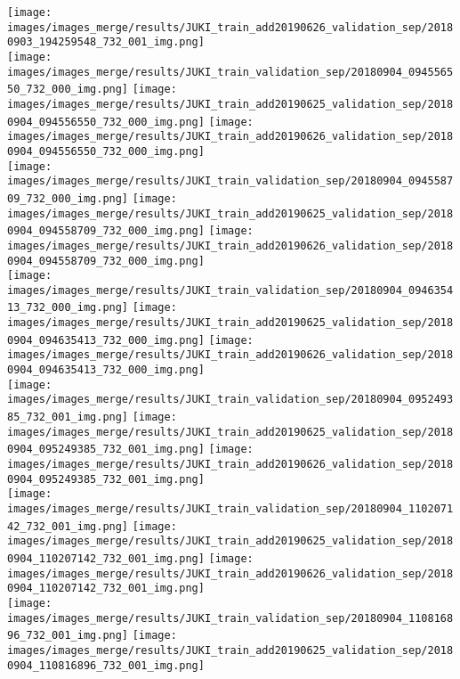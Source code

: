 \begin{center}
\texttt{[image: images/images\_merge/results/JUKI\_train\_add20190626\_validation\_sep/20180903\_194259548\_732\_001\_img.png]}\\
\texttt{[image: images/images\_merge/results/JUKI\_train\_validation\_sep/20180904\_094556550\_732\_000\_img.png]}
\texttt{[image: images/images\_merge/results/JUKI\_train\_add20190625\_validation\_sep/20180904\_094556550\_732\_000\_img.png]}
\texttt{[image: images/images\_merge/results/JUKI\_train\_add20190626\_validation\_sep/20180904\_094556550\_732\_000\_img.png]}\\
\texttt{[image: images/images\_merge/results/JUKI\_train\_validation\_sep/20180904\_094558709\_732\_000\_img.png]}
\texttt{[image: images/images\_merge/results/JUKI\_train\_add20190625\_validation\_sep/20180904\_094558709\_732\_000\_img.png]}
\texttt{[image: images/images\_merge/results/JUKI\_train\_add20190626\_validation\_sep/20180904\_094558709\_732\_000\_img.png]}\\
\texttt{[image: images/images\_merge/results/JUKI\_train\_validation\_sep/20180904\_094635413\_732\_000\_img.png]}
\texttt{[image: images/images\_merge/results/JUKI\_train\_add20190625\_validation\_sep/20180904\_094635413\_732\_000\_img.png]}
\texttt{[image: images/images\_merge/results/JUKI\_train\_add20190626\_validation\_sep/20180904\_094635413\_732\_000\_img.png]}\\
\texttt{[image: images/images\_merge/results/JUKI\_train\_validation\_sep/20180904\_095249385\_732\_001\_img.png]}
\texttt{[image: images/images\_merge/results/JUKI\_train\_add20190625\_validation\_sep/20180904\_095249385\_732\_001\_img.png]}
\texttt{[image: images/images\_merge/results/JUKI\_train\_add20190626\_validation\_sep/20180904\_095249385\_732\_001\_img.png]}\\
\texttt{[image: images/images\_merge/results/JUKI\_train\_validation\_sep/20180904\_110207142\_732\_001\_img.png]}
\texttt{[image: images/images\_merge/results/JUKI\_train\_add20190625\_validation\_sep/20180904\_110207142\_732\_001\_img.png]}
\texttt{[image: images/images\_merge/results/JUKI\_train\_add20190626\_validation\_sep/20180904\_110207142\_732\_001\_img.png]}\\
\texttt{[image: images/images\_merge/results/JUKI\_train\_validation\_sep/20180904\_110816896\_732\_001\_img.png]}
\texttt{[image: images/images\_merge/results/JUKI\_train\_add20190625\_validation\_sep/20180904\_110816896\_732\_001\_img.png]}

\end{center}
